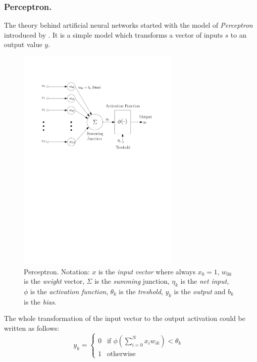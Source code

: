 \subsubsection{Perceptron.}
\label{sec:models-perceptron}

The theory behind artificial neural networks started with the model of \emph{Perceptron} introduced by \citet{mcculloch1943logical}. It is a simple model which transforms a vector of inputs $s$ to an output value $y$. 

\begin{figure}[h]
  \centering
  \includegraphics[width=0.7\textwidth]{img/perceptron.pdf}    
  \caption{Perceptron. Notation: $x$ is the \emph{input vector} where always $x_0=1$, $w_{0k}$ is the \emph{weight} vector, $\Sigma$ is the \emph{summing} junction, $\eta_k$ is the \emph{net input}, $\phi$ is the \emph{activation function}, $\theta_k$ is the \emph{treshold}, $y_k$ is the \emph{output} and $b_k$ is the \emph{bias}.} 
  \label{fig:perceptron}
\end{figure}

The whole transformation of the input vector to the output activation could be written as follows: 
\begin{equation}
\label{eq:perceptron} 
y_k =
\left\{
	\begin{array}{ll}
		0 & \mbox{if } \phi(\sum_{i=0}^N x_iw_{ik}) < \theta_k \\
		1 & \mbox{otherwise}
	\end{array}
\right.
\end{equation} 

